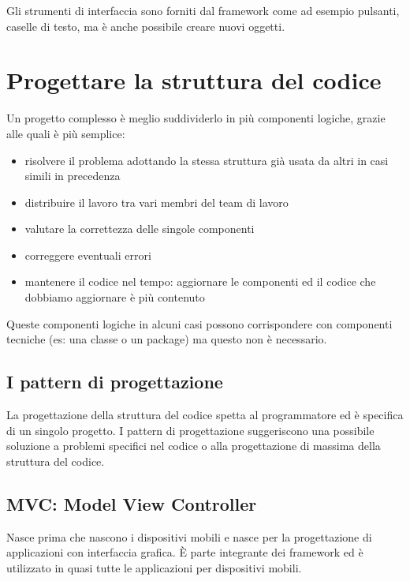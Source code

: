 Gli strumenti di interfaccia sono forniti dal framework come ad esempio pulsanti, caselle di testo, ma è anche possibile creare nuovi oggetti. 

\section{Progettare la struttura del codice}
Un progetto complesso è meglio suddividerlo in più componenti logiche, grazie alle quali è più semplice:
\begin{itemize}
    \item risolvere il problema adottando la stessa struttura già usata da altri in casi simili in precedenza
    \item distribuire il lavoro tra vari membri del team di lavoro
    \item valutare la correttezza delle singole componenti
    \item correggere eventuali errori
    \item mantenere il codice nel tempo: aggiornare le componenti ed il codice che dobbiamo aggiornare è più contenuto
\end{itemize}

Queste componenti logiche in alcuni casi possono corrispondere con componenti tecniche (es: una classe o un package) ma questo non è necessario. 

\subsection{I pattern di progettazione}
La progettazione della struttura del codice spetta al programmatore ed è specifica di un singolo progetto. 
I pattern di progettazione suggeriscono una possibile soluzione a problemi specifici nel codice o alla progettazione di massima della struttura del codice. 

\subsection{MVC: Model View Controller}
Nasce prima che nascono i dispositivi mobili e nasce per la progettazione di applicazioni con interfaccia grafica. 
È parte integrante dei framework ed è utilizzato in quasi tutte le applicazioni per dispositivi mobili.

